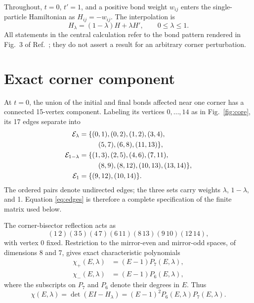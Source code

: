 \documentclass[aps,prb,reprint,amsmath,amssymb,longbibliography]{revtex4-2}
\begin{document}
Throughout, $t=0$, $t'=1$, and a positive bond weight $w_{ij}$ enters the
single-particle Hamiltonian as $H_{ij}=-w_{ij}$.  The interpolation is
\begin{equation}
 H_\lambda=(1-\lambda)H+\lambda H',\qquad 0\leq\lambda\leq1 .
 \label{eq:interpolation}
\end{equation}
All statements in the central calculation refer to the bond pattern rendered
in Fig.~3 of Ref.~\cite{Geschner2026}; they do not assert a result for an
arbitrary corner perturbation.

\section{Exact corner component}

At $t=0$, the union of the initial and final bonds affected near one corner
has a connected 15-vertex component.  Labeling its vertices $0,\ldots,14$ as
in Fig.~\ref{fig:core}, its 17 edges separate into
\begin{align}
 {\cal E}_{\lambda}={}&\{(0,1),(0,2),(1,2),(3,4),\nonumber\\
                       &\hspace{1.4em}(5,7),(6,8),(11,13)\},\nonumber\\
 {\cal E}_{1-\lambda}={}&\{(1,3),(2,5),(4,6),(7,11),\nonumber\\
                       &\hspace{1.4em}(8,9),(8,12),(10,13),(13,14)\},\nonumber\\
 {\cal E}_{1}={}&\{(9,12),(10,14)\}.
 \label{eq:edges}
\end{align}
The ordered pairs denote undirected edges; the three sets carry weights
$\lambda$, $1-\lambda$, and 1.  Equation
\eqref{eq:edges} is therefore a complete specification of the finite matrix
used below.

The corner-bisector reflection acts as
\begin{equation}
 (1\,2)(3\,5)(4\,7)(6\,11)(8\,13)(9\,10)(12\,14),
 \label{eq:reflection}
\end{equation}
with vertex 0 fixed.  Restriction to the mirror-even and mirror-odd spaces,
of dimensions 8 and 7, gives exact characteristic polynomials
\begin{equation}
 \begin{aligned}
 \chi_+(E,\lambda)&=(E-1)P_7(E,\lambda),\\
 \chi_-(E,\lambda)&=(E-1)P_6(E,\lambda),
 \end{aligned}
 \label{eq:sectorfactor}
\end{equation}
where the subscripts on $P_7$ and $P_6$ denote their degrees in $E$.
Thus
\begin{equation}
 \chi(E,\lambda)=\det(EI-H_\lambda)
   =(E-1)^2P_6(E,\lambda)P_7(E,\lambda).
 \label{eq:factorization}
\end{equation}
\end{document}
